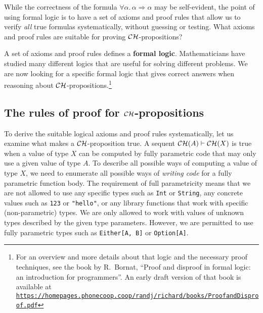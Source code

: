 While the correctness of the formula $\forall\alpha.\,\alpha\Rightarrow\alpha$
may be self-evident, the point of using formal logic is to have a
set of axioms and proof rules that allow us to verify \emph{all} true
formulas systematically, without guessing or testing. What axioms
and proof rules are suitable for proving ${\cal CH}$-propositions?

A set of axioms and proof rules defines a \textbf{formal logic}.
Mathematicians have studied many different logics that are useful
for solving different problems. We are now looking for a specific
formal logic that gives correct answers when reasoning about ${\cal CH}$-propositions.\footnote{\label{fn:Bornat-proof-book}For an overview
and more details about that logic and the necessary proof techniques,
see the book by R.~Bornat, \textsf{``}Proof and disproof in formal logic:
an introduction for programmers\textsf{''}. An early draft version of that
book is available at \texttt{\href{https://homepages.phonecoop.coop/randj/richard/books/ProofandDisproof.pdf}{https://homepages.phonecoop.coop/randj/richard/books/ProofandDisproof.pdf}}}

\subsection{The rules of proof for ${\cal CH}$-propositions\label{subsec:The-rules-of-proof}}

To derive the suitable logical axioms and proof rules systematically,
let us examine what makes a ${\cal CH}$-proposition true. A sequent
${\cal CH}(A)\vdash{\cal CH}(X)$ is true when a value of type $X$
can be computed by fully parametric code that may only use a given
value of type $A$. To describe all possible ways of computing a value
of type $X$, we need to enumerate all possible ways of \emph{writing
code} for a fully parametric function body. The requirement of full
parametricity means that we are not allowed to use any specific types
such as \lstinline!Int! or \lstinline!String!, any concrete values
such as \lstinline!123! or \lstinline!"hello"!, or any library functions
that work with specific (non-parametric) types. We are only allowed
to work with values of unknown types described by the given type parameters.
However, we are permitted to use fully parametric types such as \lstinline!Either[A, B]!
or \lstinline!Option[A]!. 

